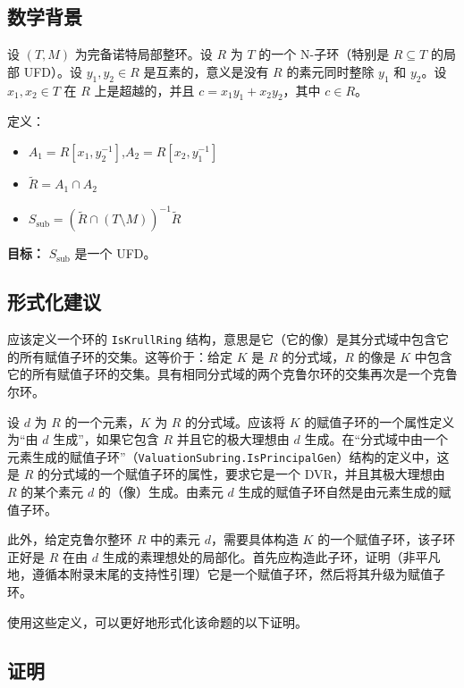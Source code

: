\subsection*{数学背景}

设 $(T, M)$ 为完备诺特局部整环。设 $R$ 为 $T$ 的一个 N-子环（特别是 $R \subseteq T$ 的局部 UFD）。设 $y_1, y_2 \in R$ 是互素的，意义是没有 $R$ 的素元同时整除 $y_1$ 和 $y_2$。设 $x_1, x_2 \in T$ 在 $R$ 上是超越的，并且 $c = x_1 y_1 + x_2 y_2$，其中 $c \in R$。

定义：
\begin{itemize}
    \item $A_1 = R[x_1, y_2^{-1}]$,\quad $A_2 = R[x_2, y_1^{-1}]$
    \item $\tilde{R} = A_1 \cap A_2$
    \item $S_{\mathrm{sub}} = (\tilde{R} \cap (T \setminus M))^{-1}\tilde{R}$
\end{itemize}

\noindent\textbf{目标：} $S_{\mathrm{sub}}$ 是一个 UFD。

\subsection*{形式化建议}

应该定义一个环的 \texttt{IsKrullRing} 结构，意思是它（它的像）是其分式域中包含它的所有赋值子环的交集。这等价于：给定 $K$ 是 $R$ 的分式域，$R$ 的像是 $K$ 中包含它的所有赋值子环的交集。具有相同分式域的两个克鲁尔环的交集再次是一个克鲁尔环。

设 $d$ 为 $R$ 的一个元素，$K$ 为 $R$ 的分式域。应该将 $K$ 的赋值子环的一个属性定义为“由 $d$ 生成”，如果它包含 $R$ 并且它的极大理想由 $d$ 生成。在“分式域中由一个元素生成的赋值子环”（\texttt{ValuationSubring.IsPrincipalGen}）结构的定义中，这是 $R$ 的分式域的一个赋值子环的属性，要求它是一个 DVR，并且其极大理想由 $R$ 的某个素元 $d$ 的（像）生成。由素元 $d$ 生成的赋值子环自然是由元素生成的赋值子环。

此外，给定克鲁尔整环 $R$ 中的素元 $d$，需要具体构造 $K$ 的一个赋值子环，该子环正好是 $R$ 在由 $d$ 生成的素理想处的局部化。首先应构造此子环，证明（非平凡地，遵循本附录末尾的支持性引理）它是一个赋值子环，然后将其升级为赋值子环。

使用这些定义，可以更好地形式化该命题的以下证明。

\subsection*{证明}

